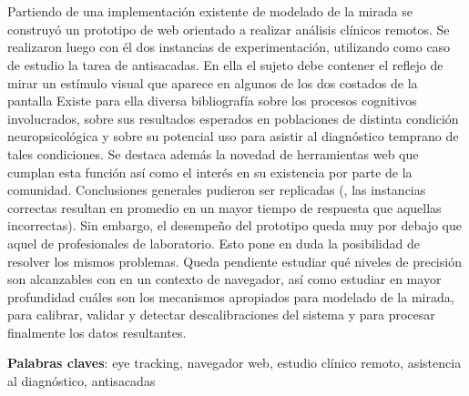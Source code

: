\chapter*{\tituloTesis}

\noindent
Partiendo de una implementación existente de modelado de la mirada se construyó
un prototipo de \eyetracker web orientado a realizar análisis clínicos remotos.
Se realizaron luego con él dos instancias de experimentación, utilizando como
caso de estudio la tarea de antisacadas.
En ella el sujeto debe contener el reflejo de mirar un estímulo visual que
aparece en algunos de los dos costados de la pantalla
Existe para ella diversa bibliografía sobre los procesos cognitivos
involucrados, sobre sus resultados esperados en poblaciones de distinta
condición neuropsicológica y sobre su potencial uso para asistir al diagnóstico
temprano de tales condiciones.
Se destaca además la novedad de herramientas web que cumplan esta función así
como el interés en su existencia por parte de la comunidad.
Conclusiones generales pudieron ser replicadas (\eg, las instancias correctas
resultan en promedio en un mayor tiempo de respuesta que aquellas incorrectas).
Sin embargo, el desempeño del prototipo queda muy por debajo que aquel de
\eyetrackers profesionales de laboratorio.
Esto pone en duda la posibilidad de resolver los mismos problemas.
Queda pendiente estudiar qué niveles de precisión son alcanzables con
\eyetracking en un contexto de navegador, así como estudiar en mayor
profundidad cuáles son los mecanismos apropiados para modelado de la mirada,
para calibrar, validar y detectar descalibraciones del sistema y para procesar
finalmente los datos resultantes.

\bigskip

\noindent \textbf{Palabras claves}:
eye tracking, navegador web, estudio clínico remoto, asistencia al diagnóstico,
antisacadas
